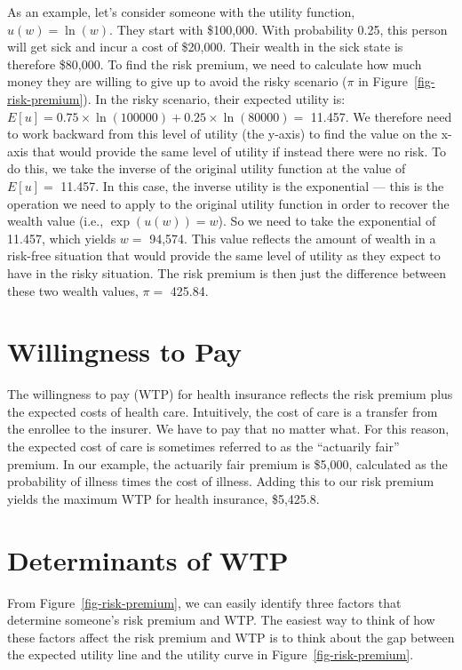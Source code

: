 \documentclass[
  letterpaper,
  DIV=11,
  numbers=noendperiod]{scrreport}
\theoremstyle{definition}
\theoremstyle{remark}
\begin{document}
As an example, let's consider someone with the utility function,
\(u(w)=\ln(w)\). They start with \$100,000. With probability 0.25, this
person will get sick and incur a cost of \$20,000. Their wealth in the
sick state is therefore \$80,000. To find the risk premium, we need to
calculate how much money they are willing to give up to avoid the risky
scenario (\(\pi\) in Figure~\ref{fig-risk-premium}). In the risky
scenario, their expected utility is:
\(E[u]=0.75\times \ln (100000) + 0.25 \times \ln (80000) =\) 11.457. We
therefore need to work backward from this level of utility (the y-axis)
to find the value on the x-axis that would provide the same level of
utility if instead there were no risk. To do this, we take the inverse
of the original utility function at the value of \(E[u] =\) 11.457. In
this case, the inverse utility is the exponential --- this is the
operation we need to apply to the original utility function in order to
recover the wealth value (i.e., \(\exp(u(w))=w\)). So we need to take
the exponential of 11.457, which yields \(w=\) 94,574. This value
reflects the amount of wealth in a risk-free situation that would
provide the same level of utility as they expect to have in the risky
situation. The risk premium is then just the difference between these
two wealth values, \(\pi =\) 425.84.

\hypertarget{willingness-to-pay}{%
\section{Willingness to Pay}\label{willingness-to-pay}}

The willingness to pay (WTP) for health insurance reflects the risk
premium plus the expected costs of health care. Intuitively, the cost of
care is a transfer from the enrollee to the insurer. We have to pay that
no matter what. For this reason, the expected cost of care is sometimes
referred to as the ``actuarily fair'' premium. In our example, the
actuarily fair premium is \$5,000, calculated as the probability of
illness times the cost of illness. Adding this to our risk premium
yields the maximum WTP for health insurance, \$5,425.8.

\hypertarget{determinants-of-wtp}{%
\section{Determinants of WTP}\label{determinants-of-wtp}}

From Figure~\ref{fig-risk-premium}, we can easily identify three factors
that determine someone's risk premium and WTP. The easiest way to think
of how these factors affect the risk premium and WTP is to think about
the gap between the expected utility line and the utility curve in
Figure~\ref{fig-risk-premium}.
\end{document}
